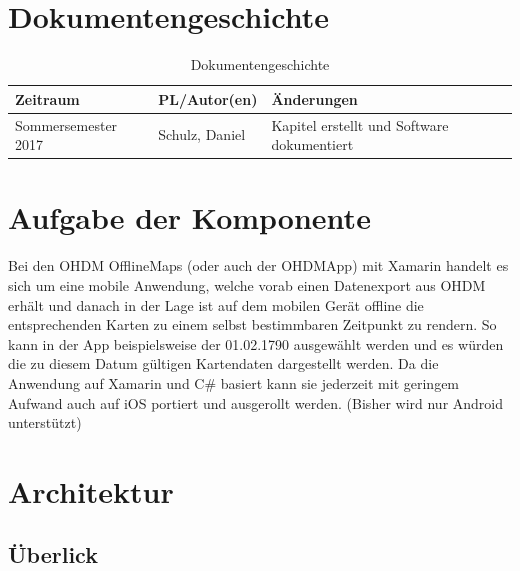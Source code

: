 \section{Dokumentengeschichte}
\begin{table}[h]
 \begin{tabular}{|l|l|p{4cm}|}
 \hline
 Zeitraum & PL/Autor(en) & Änderungen \\
 \hline
 Sommersemester 2017 & Schulz, Daniel & 
Kapitel erstellt und Software dokumentiert \newline  
  \\
 \hline
 \end{tabular}
 \caption{Dokumentengeschichte}
 \end{table}

\section{Aufgabe der Komponente}

Bei den OHDM OfflineMaps (oder auch der OHDMApp) mit Xamarin handelt es sich um eine mobile Anwendung, welche vorab einen Datenexport aus OHDM erhält und danach in der Lage ist auf dem mobilen Gerät offline die entsprechenden Karten zu einem selbst bestimmbaren Zeitpunkt zu rendern.
So kann in der App beispielsweise der 01.02.1790 ausgewählt werden und es würden die zu diesem Datum gültigen Kartendaten dargestellt werden.
Da die Anwendung auf Xamarin und C\# basiert kann sie jederzeit mit geringem Aufwand auch auf iOS portiert und ausgerollt werden. (Bisher wird nur Android unterstützt)

\section{Architektur}

\subsection{Überlick}\label{ch:offlineoverview}

